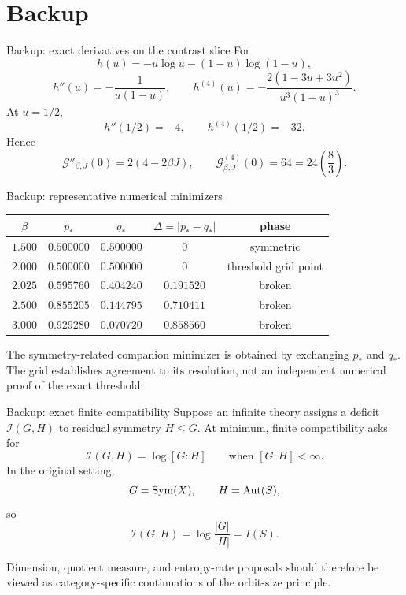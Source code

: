 \section{Backup}

\begin{frame}{Backup: exact derivatives on the contrast slice}
  For
  \[
    h(u)=-u\log u-(1-u)\log(1-u),
  \]
  \[
    h''(u)=-\frac{1}{u(1-u)},
    \qquad
    h^{(4)}(u)=-\frac{2(1-3u+3u^2)}{u^3(1-u)^3}.
  \]
  At $u=1/2$,
  \[
    h''(1/2)=-4,
    \qquad
    h^{(4)}(1/2)=-32.
  \]
  Hence
  \[
    \mathcal G''_{\beta,J}(0)=2(4-2\beta J),
    \qquad
    \mathcal G^{(4)}_{\beta,J}(0)=64
      =24\left(\frac83\right).
  \]
\end{frame}

\begin{frame}{Backup: representative numerical minimizers}
  \centering
  \begin{tabular}{ccccc}
    \toprule
    $\beta$ & $p_*$ & $q_*$ & $\Delta=|p_*-q_*|$ & phase \\
    \midrule
    $1.500$ & $0.500000$ & $0.500000$ & $0$ & symmetric \\
    $2.000$ & $0.500000$ & $0.500000$ & $0$ & threshold grid point \\
    $2.025$ & $0.595760$ & $0.404240$ & $0.191520$ & broken \\
    $2.500$ & $0.855205$ & $0.144795$ & $0.710411$ & broken \\
    $3.000$ & $0.929280$ & $0.070720$ & $0.858560$ & broken \\
    \bottomrule
  \end{tabular}

  \vspace{1em}
  The symmetry-related companion minimizer is obtained by exchanging $p_*$ and
  $q_*$. The grid establishes agreement to its resolution, not an independent
  numerical proof of the exact threshold.
\end{frame}

\begin{frame}{Backup: exact finite compatibility}
  Suppose an infinite theory assigns a deficit $\mathcal I(G,H)$ to residual
  symmetry $H\leq G$. At minimum, finite compatibility asks for
  \[
    \mathcal I(G,H)=\log[G:H]
    \qquad\text{when }[G:H]<\infty.
  \]
  In the original setting,
  \[
    G=\operatorname{Sym}(X),\qquad H=\operatorname{Aut}(S),
  \]
  so
  \[
    \mathcal I(G,H)=\log\frac{|G|}{|H|}=I(S).
  \]

  Dimension, quotient measure, and entropy-rate proposals should therefore be
  viewed as category-specific continuations of the orbit-size principle.
\end{frame}

